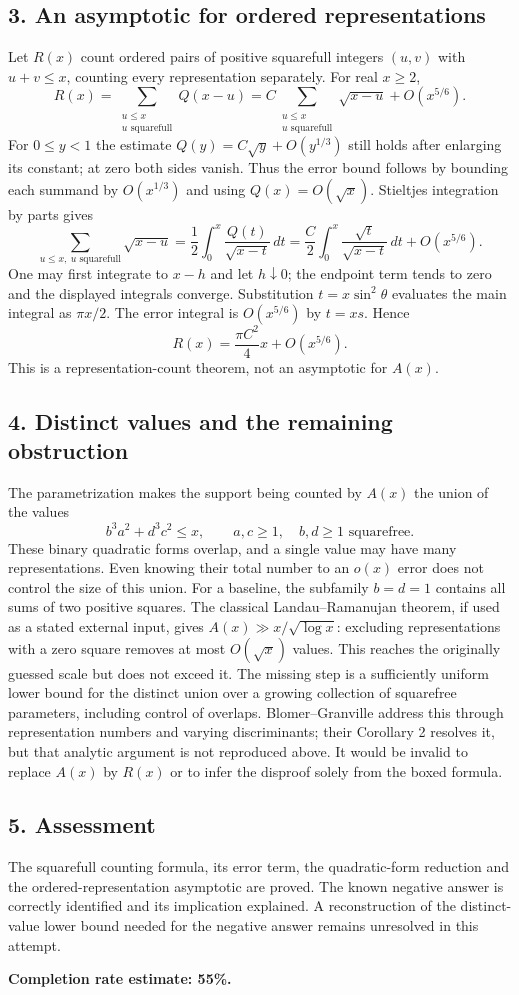 \subsection*{3. An asymptotic for ordered representations}
Let $R(x)$ count ordered pairs of positive squarefull integers $(u,v)$ with $u+v\le x$, counting every representation separately. For real $x\ge2$,
\[
 R(x)=\sum_{\substack{u\le x\\u\text{ squarefull}}}Q(x-u)
 =C\sum_{\substack{u\le x\\u\text{ squarefull}}}\sqrt{x-u}+O(x^{5/6}).
\]
For $0\le y<1$ the estimate $Q(y)=C\sqrt y+O(y^{1/3})$ still holds after enlarging its constant; at zero both sides vanish. Thus the error bound follows by bounding each summand by $O(x^{1/3})$ and using $Q(x)=O(\sqrt x)$.
Stieltjes integration by parts gives
\[
 \sum_{u\le x,\ u\text{ squarefull}}\sqrt{x-u}
 =\frac12\int_0^x\frac{Q(t)}{\sqrt{x-t}}\,dt
 =\frac C2\int_0^x\frac{\sqrt t}{\sqrt{x-t}}\,dt+O(x^{5/6}).
\]
One may first integrate to $x-h$ and let $h\downarrow0$; the endpoint term tends to zero and the displayed integrals converge. Substitution $t=x\sin^2\theta$ evaluates the main integral as $\pi x/2$. The error integral is $O(x^{5/6})$ by $t=xs$. Hence
\[
 \boxed{R(x)=\frac{\pi C^2}{4}x+O(x^{5/6}).}
\]
This is a representation-count theorem, not an asymptotic for $A(x)$.

\subsection*{4. Distinct values and the remaining obstruction}
The parametrization makes the support being counted by $A(x)$ the union of the values
\[
 b^3a^2+d^3c^2\le x,\qquad a,c\ge1,\quad b,d\ge1\text{ squarefree}.
\]
These binary quadratic forms overlap, and a single value may have many representations. Even knowing their total number to an $o(x)$ error does not control the size of this union. For a baseline, the subfamily $b=d=1$ contains all sums of two positive squares. The classical Landau--Ramanujan theorem, if used as a stated external input, gives $A(x)\gg x/\sqrt{\log x}$: excluding representations with a zero square removes at most $O(\sqrt x)$ values. This reaches the originally guessed scale but does not exceed it.
The missing step is a sufficiently uniform lower bound for the distinct union over a growing collection of squarefree parameters, including control of overlaps. Blomer--Granville address this through representation numbers and varying discriminants; their Corollary 2 resolves it, but that analytic argument is not reproduced above. It would be invalid to replace $A(x)$ by $R(x)$ or to infer the disproof solely from the boxed formula.

\subsection*{5. Assessment}
The squarefull counting formula, its error term, the quadratic-form reduction and the ordered-representation asymptotic are proved. The known negative answer is correctly identified and its implication explained. A reconstruction of the distinct-value lower bound needed for the negative answer remains unresolved in this attempt.

\textbf{Completion rate estimate: 55\%.}

